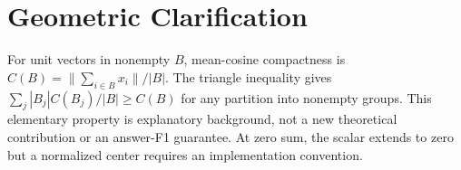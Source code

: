 \documentclass[11pt]{article}
\begin{document}
\section{Geometric Clarification}
\label{app:geometry}
For unit vectors in nonempty $B$, mean-cosine compactness is
$C(B)=\|\sum_{i\in B}x_i\|/|B|$. The triangle inequality gives
$\sum_j |B_j|C(B_j)/|B|\geq C(B)$ for any partition into nonempty groups.
This elementary property is explanatory background, not a new theoretical
contribution or an answer-F1 guarantee. At zero sum, the scalar extends to
zero but a normalized center requires an implementation convention.


\end{document}
